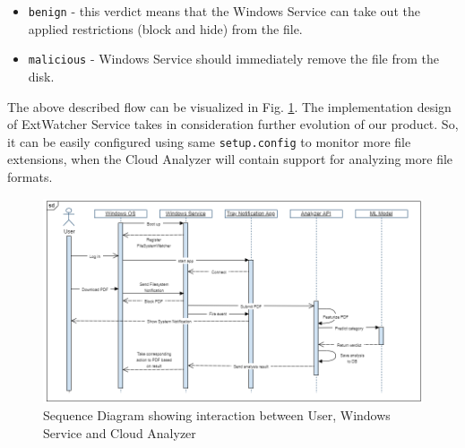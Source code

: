 \begin{itemize}
	\item \texttt{benign} - this verdict means that the Windows Service can take out the applied restrictions (block and hide) from the file.
	\item \texttt{malicious} - Windows Service should immediately remove the file from the disk.
\end{itemize}

The above described flow can be visualized in Fig. \ref{sequence}. The implementation design of ExtWatcher Service takes in consideration further evolution of our product. So, it can be easily configured using same \texttt{setup.config} to monitor more file extensions, when the Cloud Analyzer will contain support for analyzing more file formats.

\begin{figure}[H]
	\centerline{\includegraphics[scale=0.55]{figures/sequence.png}}  
	\caption{Sequence Diagram showing interaction between User, Windows Service and Cloud Analyzer}
	\label{sequence}
\end{figure}



